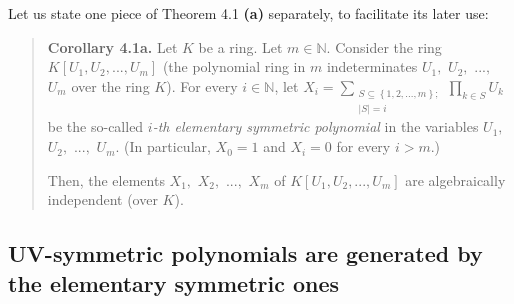 \documentclass[numbers=enddot,12pt,final,onecolumn,notitlepage]{scrartcl}%
\begin{document}
Let us state one piece of Theorem 4.1 \textbf{(a)} separately, to facilitate
its later use:

\begin{quote}
\textbf{Corollary 4.1a.} Let $K$ be a ring. Let $m\in\mathbb{N}$. Consider the
ring $K\left[  U_{1},U_{2},...,U_{m}\right]  $ (the polynomial ring in $m$
indeterminates $U_{1},$ $U_{2},$ $...,$ $U_{m}$ over the ring $K$). For every
$i\in\mathbb{N}$, let $X_{i}=\sum\limits_{\substack{S\subseteq\left\{
1,2,...,m\right\}  ;\\\left\vert S\right\vert =i}}\prod\limits_{k\in S}U_{k}$
be the so-called $i$\textit{-th elementary symmetric polynomial} in the
variables $U_{1},$ $U_{2},$ $...,$ $U_{m}$. (In particular, $X_{0}=1$ and
$X_{i}=0$ for every $i>m$.)

Then, the elements $X_{1},$ $X_{2},$ $...,$ $X_{m}$ of $K\left[  U_{1}%
,U_{2},...,U_{m}\right]  $ are algebraically independent (over $K$).
\end{quote}

\subsection{UV-symmetric polynomials are generated by the elementary symmetric
ones}
\end{document}
